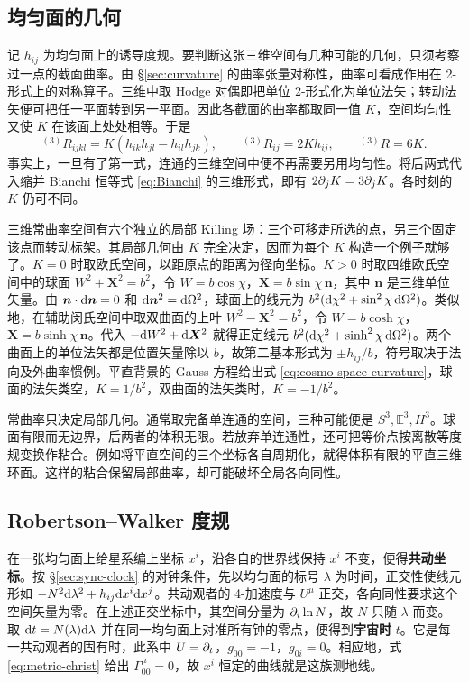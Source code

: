 \subsection{均匀面的几何}

记 $h_{ij}$ 为均匀面上的诱导度规。要判断这张三维空间有几种可能的几何，只须考察过一点的截面曲率。由 \S\ref{sec:curvature} 的曲率张量对称性，曲率可看成作用在 2-形式上的对称算子。三维中取 Hodge 对偶即把单位 2-形式化为单位法矢；转动法矢便可把任一平面转到另一平面。因此各截面的曲率都取同一值 $K$，空间均匀性又使 $K$ 在该面上处处相等。于是
\begin{equation}\label{eq:cosmo-space-curvature}
    {}^{(3)}\!R_{ijkl}=K(h_{ik}h_{jl}-h_{il}h_{jk}),\qquad
    {}^{(3)}\!R_{ij}=2Kh_{ij},\qquad {}^{(3)}\!R=6K .
\end{equation}
事实上，一旦有了第一式，连通的三维空间中便不再需要另用均匀性。将后两式代入缩并 Bianchi 恒等式 \eqref{eq:Bianchi} 的三维形式，即有 $2\partial_j K=3\partial_j K$。各时刻的 $K$ 仍可不同。

三维常曲率空间有六个独立的局部 Killing 场：三个可移走所选的点，另三个固定该点而转动标架。其局部几何由 $K$ 完全决定，因而为每个 $K$ 构造一个例子就够了。$K=0$ 时取欧氏空间，以距原点的距离为径向坐标。$K>0$ 时取四维欧氏空间中的球面 $W^2+\bm X^2=b^2$，令 $W=b\cos\chi$，$\bm X=b\sin\chi\,\bm n$，其中 $\bm n$ 是三维单位矢量。由 $\bm n\cdot\dd\bm n=0$ 和 $\dd\bm n^2=\dd\Omega^2$，球面上的线元为 $b^2(\dd\chi^2+\sin^2\chi\,\dd\Omega^2)$。类似地，在辅助闵氏空间中取双曲面的上叶 $W^2-\bm X^2=b^2$，令 $W=b\cosh\chi$，$\bm X=b\sinh\chi\,\bm n$。代入 $-\dd W^2+\dd\bm X^2$ 就得正定线元 $b^2(\dd\chi^2+\sinh^2\chi\,\dd\Omega^2)$。两个曲面上的单位法矢都是位置矢量除以 $b$，故第二基本形式为 $\pm h_{ij}/b$，符号取决于法向及外曲率惯例。平直背景的 Gauss 方程给出式 \eqref{eq:cosmo-space-curvature}，球面的法矢类空，$K=1/b^2$，双曲面的法矢类时，$K=-1/b^2$。

常曲率只决定局部几何。通常取完备单连通的空间，三种可能便是 $S^3,\mathbb E^3,H^3$。球面有限而无边界，后两者的体积无限。若放弃单连通性，还可把等价点按离散等度规变换作粘合。例如将平直空间的三个坐标各自周期化，就得体积有限的平直三维环面。这样的粘合保留局部曲率，却可能破坏全局各向同性。

\subsection{Robertson--Walker 度规}

在一张均匀面上给星系编上坐标 $x^i$，沿各自的世界线保持 $x^i$ 不变，便得\textbf{共动坐标}。按 \S\ref{sec:sync-clock} 的对钟条件，先以均匀面的标号 $\lambda$ 为时间，正交性使线元形如 $-N^2\dd\lambda^2+h_{ij}\dd x^i\dd x^j$。共动观者的 4-加速度与 $U^\mu$ 正交，各向同性要求这个空间矢量为零。在上述正交坐标中，其空间分量为 $\partial_i\ln N$，故 $N$ 只随 $\lambda$ 而变。取 $\dd t=N(\lambda)\dd\lambda$ 并在同一均匀面上对准所有钟的零点，便得到\textbf{宇宙时} $t$。它是每一共动观者的固有时，此系中 $U=\partial_t$，$g_{00}=-1$，$g_{0i}=0$。相应地，式 \eqref{eq:metric-christ} 给出 $\Gamma^\mu_{00}=0$，故 $x^i$ 恒定的曲线就是这族测地线。

